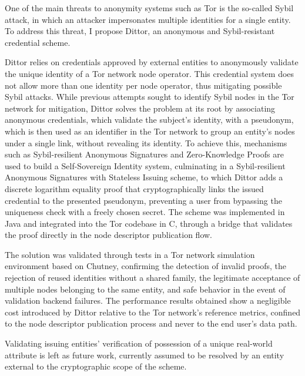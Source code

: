 
%

One of the main threats to anonymity systems such as Tor is the so-called Sybil attack, in which an attacker impersonates multiple identities for a single entity. To address this threat, I propose Dittor, an anonymous and Sybil-resistant credential scheme.

Dittor relies on credentials approved by external entities to anonymously validate the unique identity of a Tor network node operator. This credential system does not allow more than one identity per node operator, thus mitigating possible Sybil attacks. While previous attempts sought to identify Sybil nodes in the Tor network for mitigation, Dittor solves the problem at its root by associating anonymous credentials, which validate the subject's identity, with a pseudonym, which is then used as an identifier in the Tor network to group an entity's nodes under a single link, without revealing its identity. To achieve this, mechanisms such as Sybil-resilient Anonymous Signatures and Zero-Knowledge Proofs are used to build a Self-Sovereign Identity system, culminating in a Sybil-resilient Anonymous Signatures with Stateless Issuing scheme, to which Dittor adds a discrete logarithm equality proof that cryptographically links the issued credential to the presented pseudonym, preventing a user from bypassing the uniqueness check with a freely chosen secret. The scheme was implemented in Java and integrated into the Tor codebase in C, through a bridge that validates the proof directly in the node descriptor publication flow.

The solution was validated through tests in a Tor network simulation environment based on Chutney, confirming the detection of invalid proofs, the rejection of reused identities without a shared family, the legitimate acceptance of multiple nodes belonging to the same entity, and safe behavior in the event of validation backend failures. The performance results obtained show a negligible cost introduced by Dittor relative to the Tor network's reference metrics, confined to the node descriptor publication process and never to the end user's data path.

Validating issuing entities' verification of possession of a unique real-world attribute is left as future work, currently assumed to be resolved by an entity external to the cryptographic scope of the scheme.

